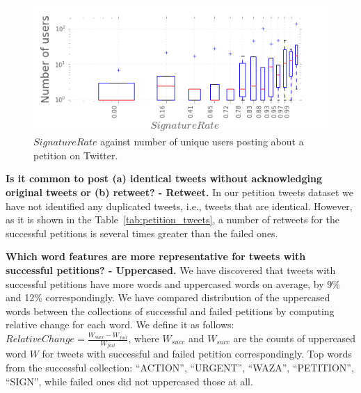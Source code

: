 \begin{figure}
\centering
\includegraphics[scale=0.45]{figures/signaturesgoalVSnumusersCampaigns.png}
\caption{$SignatureRate$ against number of unique users posting about a petition on Twitter.}
\label{fig:signatures_vs_users}
\end{figure}

\textbf{Is it common to post (a) identical tweets without acknowledging original tweets or (b) retweet? - Retweet.} In our petition tweets dataset we have not identified any duplicated tweets, i.e., tweets that are identical. However, as it is shown in the Table~\ref{tab:petition_tweets}, a number of retweets for the successful petitions is several times greater than the failed ones.

\textbf{Which word features are more representative for tweets with successful petitions? - Uppercased.} We have discovered that tweets with successful petitions have more words and uppercased words on average, by 9\% and 12\% correspondingly. We have compared distribution of the uppercased words between the collections of successful and failed petitions by computing relative change for each word. We define it as follows: $RelativeChange = \frac{W_{succ} - W_{fail}}{W_{fail}}$, where $W_{succ}$ and $W_{succ}$ are the counts of uppercased word $W$ for tweets with successful and failed petition correspondingly. Top words from the successful collection: ``ACTION'', ``URGENT'', ``WAZA'', ``PETITION'', ``SIGN'', while failed ones did not uppercased those at all.
